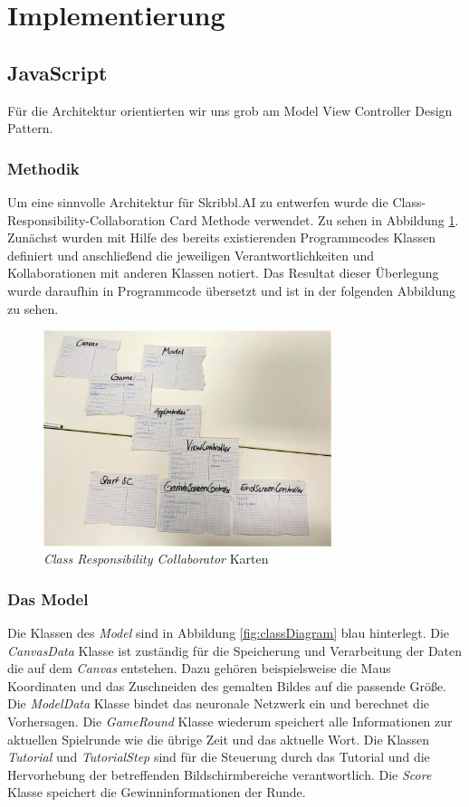 \documentclass[11pt]{article}
\begin{document}
\section{Implementierung}
\subsection{JavaScript}
Für die Architektur orientierten wir uns grob am Model View Controller Design Pattern.
\subsubsection{Methodik}
Um eine sinnvolle Architektur für Skribbl.AI zu entwerfen wurde die Class-Responsibility-Collaboration Card Methode verwendet. Zu sehen in Abbildung \ref{fig:crcCard}. Zunächst wurden mit Hilfe des bereits existierenden Programmcodes Klassen definiert und anschließend die jeweiligen Verantwortlichkeiten und Kollaborationen mit anderen Klassen notiert. Das Resultat dieser Überlegung wurde daraufhin in Programmcode übersetzt und ist in der folgenden Abbildung zu sehen.

\begin{figure}[ht]
\centering
\includegraphics[width=0.75\textwidth]{images/crc.png}
\caption{\label{fig:crcCard}\textit{Class Responsibility Collaborator} Karten}
\end{figure}

\subsubsection{Das Model}
Die Klassen des \textit{Model} sind in Abbildung \ref{fig:classDiagram} blau hinterlegt. Die \textit{CanvasData} Klasse ist zuständig für die Speicherung und Verarbeitung der Daten die auf dem \textit{Canvas} entstehen. Dazu gehören beispielsweise die Maus Koordinaten und das Zuschneiden des gemalten Bildes auf die passende Größe. Die \textit{ModelData} Klasse bindet das neuronale Netzwerk ein und berechnet die Vorhersagen. Die \textit{GameRound} Klasse wiederum speichert alle Informationen zur aktuellen Spielrunde wie die übrige Zeit und das aktuelle Wort. Die Klassen \textit{Tutorial} und \textit{TutorialStep} sind für die Steuerung durch das Tutorial und die Hervorhebung der betreffenden Bildschirmbereiche verantwortlich. Die \textit{Score} Klasse speichert die Gewinninformationen der Runde.
\end{document}
